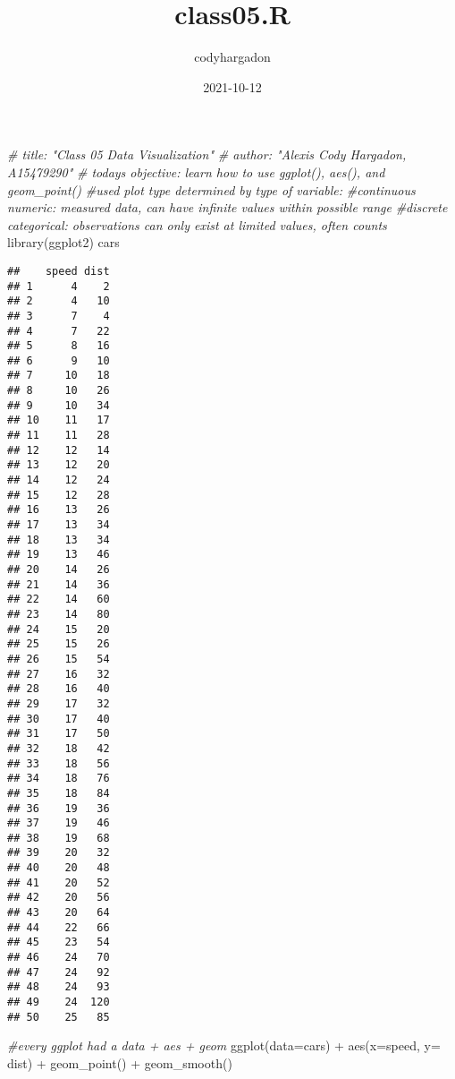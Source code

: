 \documentclass[
]{article}
\title{class05.R}
\author{codyhargadon}
\date{2021-10-12}
\newenvironment{Shaded}{\begin{snugshade}}{\end{snugshade}}
\newcommand{\AttributeTok}[1]{\textcolor[rgb]{0.77,0.63,0.00}{#1}}
\newcommand{\CommentTok}[1]{\textcolor[rgb]{0.56,0.35,0.01}{\textit{#1}}}
\newcommand{\FunctionTok}[1]{\textcolor[rgb]{0.00,0.00,0.00}{#1}}
\newcommand{\NormalTok}[1]{#1}
\newcommand{\SpecialCharTok}[1]{\textcolor[rgb]{0.00,0.00,0.00}{#1}}
\begin{document}
\maketitle

\begin{Shaded}
\begin{Highlighting}[]
\CommentTok{\# \textquotesingle{}title: "Class 05 Data Visualization"}
\CommentTok{\# \textquotesingle{}author: "Alexis Cody Hargadon, A15479290"}
\CommentTok{\# today\textquotesingle{}s objective: learn how to use ggplot(), aes(), and geom\_point()}
\CommentTok{\#used plot type determined by type of variable:}
  \CommentTok{\#continuous numeric: measured data, can have infinite values within possible range}
  \CommentTok{\#discrete categorical: observations can only exist at limited values, often counts}
\FunctionTok{library}\NormalTok{(ggplot2)}
\NormalTok{cars}
\end{Highlighting}
\end{Shaded}

\begin{verbatim}
##    speed dist
## 1      4    2
## 2      4   10
## 3      7    4
## 4      7   22
## 5      8   16
## 6      9   10
## 7     10   18
## 8     10   26
## 9     10   34
## 10    11   17
## 11    11   28
## 12    12   14
## 13    12   20
## 14    12   24
## 15    12   28
## 16    13   26
## 17    13   34
## 18    13   34
## 19    13   46
## 20    14   26
## 21    14   36
## 22    14   60
## 23    14   80
## 24    15   20
## 25    15   26
## 26    15   54
## 27    16   32
## 28    16   40
## 29    17   32
## 30    17   40
## 31    17   50
## 32    18   42
## 33    18   56
## 34    18   76
## 35    18   84
## 36    19   36
## 37    19   46
## 38    19   68
## 39    20   32
## 40    20   48
## 41    20   52
## 42    20   56
## 43    20   64
## 44    22   66
## 45    23   54
## 46    24   70
## 47    24   92
## 48    24   93
## 49    24  120
## 50    25   85
\end{verbatim}

\begin{Shaded}
\begin{Highlighting}[]
\CommentTok{\#every ggplot had a data + aes + geom}
\FunctionTok{ggplot}\NormalTok{(}\AttributeTok{data=}\NormalTok{cars) }\SpecialCharTok{+}
  \FunctionTok{aes}\NormalTok{(}\AttributeTok{x=}\NormalTok{speed, }\AttributeTok{y=}\NormalTok{ dist) }\SpecialCharTok{+}
  \FunctionTok{geom\_point}\NormalTok{() }\SpecialCharTok{+}
  \FunctionTok{geom\_smooth}\NormalTok{() }
\end{Highlighting}
\end{Shaded}
\end{document}
